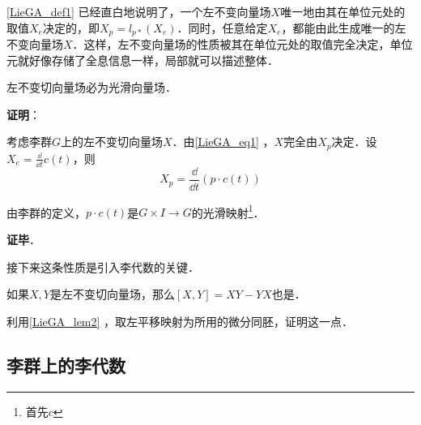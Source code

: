 \autoref{LieGA_def1} 已经直白地说明了，一个左不变向量场$X$唯一地由其在单位元处的取值$X_e$决定的，即$X_p=l_{p*}(X_e)$．同时，任意给定$X_e$，都能由此生成唯一的左不变向量场$X$．这样，左不变向量场的性质被其在单位元处的取值完全决定，单位元就好像存储了全息信息一样，局部就可以描述整体．

\begin{theorem}{}
左不变切向量场必为光滑向量场．
\end{theorem}

\textbf{证明}：


考虑李群$G$上的左不变切向量场$X$．由\autoref{LieGA_eq1} ，$X$完全由$X_p$决定．设$X_e=\frac{\dd }{\dd t}c(t)$，则
\begin{equation}
X_p=\frac{\dd}{\dd t}(p\cdot c(t))
\end{equation}

由李群的定义，$p\cdot c(t)$是$G\times I\to G$的光滑映射\footnote{首先$c$}．









\textbf{证毕}．

接下来这条性质是引入李代数的关键．

\begin{exercise}{}
如果$X, Y$是左不变切向量场，那么$[X, Y]=XY-YX$也是．

利用\autoref{LieGA_lem2} ，取左平移映射为所用的微分同胚，证明这一点．
\end{exercise}


\subsection{李群上的李代数}

